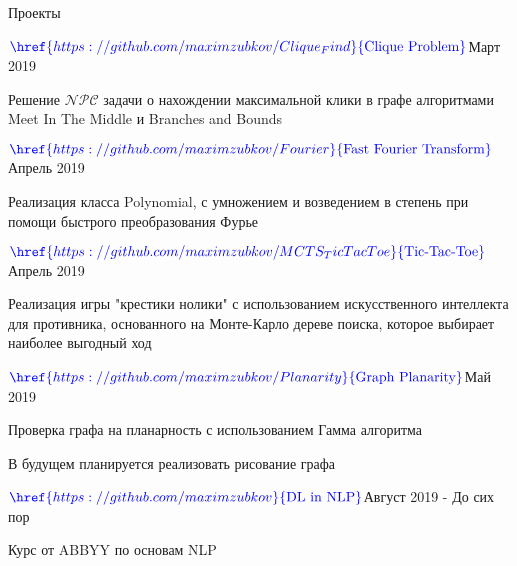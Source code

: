 \documentclass{resume} %
\begin{document}
\begin{rSection}{Проекты}
\begin{rSubsection}{$\textcolor{blue}{\href{https://github.com/maximzubkov/Clique_Find}{\textnormal{Clique Problem}}}$}{Март 2019}{}{}
\item Решение $\mathcal{NPC}$ задачи о нахождении максимальной клики в графе алгоритмами Meet In The Middle и  Branches and Bounds
\end{rSubsection}

\begin{rSubsection}{$\textcolor{blue}{\href{https://github.com/maximzubkov/Fourier}{\textnormal{Fast Fourier Transform}}}$}{Апрель 2019}{}{}
\item Реализация класса Polynomial, с умножением и возведением в степень при помощи быстрого преобразования Фурье
\end{rSubsection}

\begin{rSubsection}{$\textcolor{blue}{\href{https://github.com/maximzubkov/MCTS_TicTacToe}{\textnormal{Tic-Tac-Toe}}}$}{Апрель 2019}{}{}
\item Реализация игры "крестики нолики" с использованием искусственного интеллекта для противника, основанного на Монте-Карло дереве поиска, которое выбирает наиболее выгодный ход
\end{rSubsection}

\begin{rSubsection}{$\textcolor{blue}{\href{https://github.com/maximzubkov/Planarity}{\textnormal{Graph Planarity}}}$}{Май 2019}{}{}
\item Проверка графа на планарность с использованием Гамма алгоритма
\item В будущем планируется реализовать рисование графа 
\end{rSubsection}

\begin{rSubsection}{$\textcolor{blue}{\href{https://github.com/maximzubkov}{\textnormal{DL in NLP}}}$}{Август 2019 - До сих пор}{}{}
\item Курс от ABBYY по основам NLP
\end{rSubsection}

\end{rSection}
\end{document}
